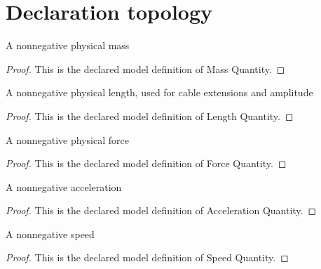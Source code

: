 \section{Declaration topology}
\begin{definition}
  \label{def:physics:phyx-mini-0271:phyxminiproblems-problemphyxmini0271-massquantity}
  A nonnegative physical mass
\end{definition}
\begin{proof}
  This is the declared model definition of Mass Quantity.
\end{proof}
\begin{definition}
  \label{def:physics:phyx-mini-0271:phyxminiproblems-problemphyxmini0271-lengthquantity}
  A nonnegative physical length, used for cable extensions and amplitude
\end{definition}
\begin{proof}
  This is the declared model definition of Length Quantity.
\end{proof}
\begin{definition}
  \label{def:physics:phyx-mini-0271:phyxminiproblems-problemphyxmini0271-forcequantity}
  A nonnegative physical force
\end{definition}
\begin{proof}
  This is the declared model definition of Force Quantity.
\end{proof}
\begin{definition}
  \label{def:physics:phyx-mini-0271:phyxminiproblems-problemphyxmini0271-accelerationquantity}
  A nonnegative acceleration
\end{definition}
\begin{proof}
  This is the declared model definition of Acceleration Quantity.
\end{proof}
\begin{definition}
  \label{def:physics:phyx-mini-0271:phyxminiproblems-problemphyxmini0271-speedquantity}
  A nonnegative speed
\end{definition}
\begin{proof}
  This is the declared model definition of Speed Quantity.
\end{proof}
